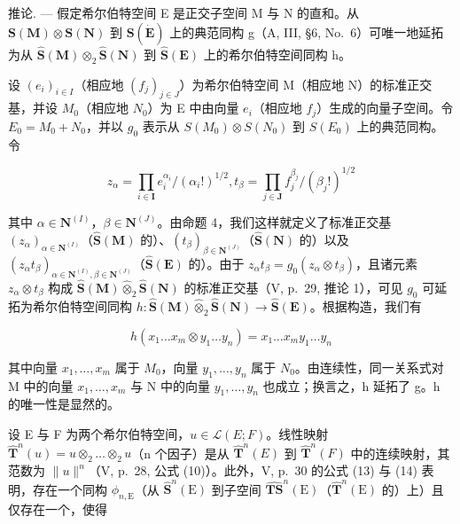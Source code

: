推论. --- 假定希尔伯特空间 E 是正交子空间 M 与 N 的直和。从 \(\mathbf{S}(\mathbf{M}) \otimes \mathbf{S}(\mathbf{N})\) 到 \(\mathbf{S}(\dot{\mathbf{E}})\) 上的典范同构 g（A, III, §6, No.~6）可唯一地延拓为从 \(\hat{\mathbf{S}}(\mathbf{M}) \otimes_{2} \hat{\mathbf{S}}(\mathbf{N})\) 到 \(\hat{\mathbf{S}}(\mathbf{E})\) 上的希尔伯特空间同构 h。

设 \((e_{i})_{i\in I}\)（相应地 \((f_{j})_{j\in J}\)）为希尔伯特空间 M（相应地 N）的标准正交基，并设 \(M_{0}\)（相应地 \(N_{0}\)）为 E 中由向量 \(e_{i}\)（相应地 \(f_{j}\)）生成的向量子空间。令 \(E_{0}=M_{0}+N_{0}\)，并以 \(g_{0}\) 表示从 \(S(M_{0})\otimes S(N_{0})\) 到 \(S(E_{0})\) 上的典范同构。令

\[
z _ {\alpha} = \prod_ {i \in \mathbf {I}} e _ {i} ^ {\alpha_ {i}} / (\alpha_ {i}!) ^ {1 / 2}, t _ {\beta} = \prod_ {j \in \mathbf {J}} f _ {j} ^ {\beta _ {j}} / (\beta_ {j}!) ^ {1 / 2}
\]

其中 \(\alpha \in \mathbf{N}^{(I)}\)，\(\beta \in \mathbf{N}^{(J)}\)。由命题 4，我们这样就定义了标准正交基 \((z_{\alpha})_{\alpha \in \mathbf{N}^{(I)}}\)（\(\hat{\mathbf{S}}(\mathbf{M})\) 的）、\((t_{\beta})_{\beta \in \mathbf{N}^{(J)}}\)（\(\hat{\mathbf{S}}(\mathbf{N})\) 的）以及 \((z_{\alpha}t_{\beta})_{\alpha \in \mathbf{N}^{(I)},\beta \in \mathbf{N}^{(J)}}\)（\(\hat{\mathbf{S}}(\mathbf{E})\) 的）。由于 \(z_{\alpha}t_{\beta} = g_0(z_{\alpha}\otimes t_{\beta})\)，且诸元素 \(z_{\alpha}\otimes t_{\beta}\) 构成 \(\hat{\mathbf{S}}(\mathbf{M})\hat{\otimes}_2\hat{\mathbf{S}}(\mathbf{N})\) 的标准正交基（V, p.~29, 推论 1），可见 \(g_0\) 可延拓为希尔伯特空间同构 \(h:\hat{\mathbf{S}}(\mathbf{M})\hat{\otimes}_2\hat{\mathbf{S}}(\mathbf{N})\to \hat{\mathbf{S}}(\mathbf{E})\)。根据构造，我们有

\[
h (x _ {1} \dots x _ {m} \otimes y _ {1} \dots y _ {n}) = x _ {1} \dots x _ {m} y _ {1} \dots y _ {n}
\]

其中向量 \(x_{1}, \ldots, x_{m}\) 属于 \(M_{0}\)，向量 \(y_{1}, \ldots, y_{n}\) 属于 \(N_{0}\)。由连续性，同一关系式对 M 中的向量 \(x_{1}, \ldots, x_{m}\) 与 N 中的向量 \(y_{1}, \ldots, y_{n}\) 也成立；换言之，h 延拓了 g。h 的唯一性是显然的。

设 E 与 F 为两个希尔伯特空间，\(u \in \mathcal{L}(E; F)\)。线性映射 \(\hat{\mathbf{T}}^{n}(u) = u \otimes_{2} \ldots \otimes_{2} u\)（n 个因子）是从 \(\hat{\mathbf{T}}^{n}(E)\) 到 \(\hat{\mathbf{T}}^{n}(F)\) 中的连续映射，其范数为 \(\|u\|^{n}\)（V, p.~28, 公式 (10)）。此外，V, p.~30 的公式 (13) 与 (14) 表明，存在一个同构 \(\phi_{n,\mathrm{E}}\)（从 \(\hat{\mathbf{S}}^n (\mathrm{E})\) 到子空间 \(\widehat{\mathbf{T}\mathbf{S}}^n (\mathrm{E})\)（\(\hat{\mathbf{T}}^n (\mathrm{E})\) 的）上）且仅存在一个，使得

